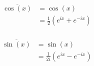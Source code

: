 \begin{equation}\label{eq:Sinusoid_Complex_Conjugate-Cosine}
  \begin{aligned}
    \overline{\cos(x)} &= \cos(x) \\
    &= \frac{1}{2} \left( e^{ix} + e^{-ix} \right) \\
  \end{aligned}
\end{equation}

\begin{equation}\label{eq:Sinusoid_Complex_Conjugate-Sine}
  \begin{aligned}
    \overline{\sin(x)} &= \sin(x) \\
    &= \frac{1}{2i} \left( e^{ix} - e^{-ix} \right) \\
  \end{aligned}
\end{equation}

